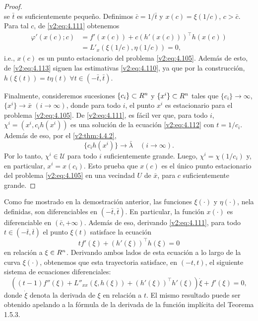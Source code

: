 \begin{proof}
\begin{equation}
        \label{v2:eq:4.113}
    \end{equation}
    se $\bar{t}$ es suficientemente pequeño.
    Definimos $\bar{c} = 1/\bar{t}$ y $x(c) = \xi(1/c)$, $c > \bar{c}$. Para tal $c$, de \eqref{v2:eq:4.111} obtenemos
    \begin{align*}
        \varphi'(x(c); c) &= f'(x(c)) + c(h'(x(c)))^\top h(x(c)) \\
        &= L'_x(\xi(1/c), \eta(1/c)) = 0,
    \end{align*}
    i.e., $x(c)$ es un punto estacionario del problema \eqref{v2:eq:4.105}. Además de esto, de \eqref{v2:eq:4.113} siguen las estimativas \eqref{v2:eq:4.110}, ya que por la construcción, $h(\xi(t)) = t\eta(t) \; \forall t \in (-\bar{t}, \bar{t})$.

    Finalmente, consideremos sucesiones $\{c_i\} \subset R^n$ y $\{x^i\} \subset R^n$ tales que $\{c_i\} \to \infty$, $\{x^i\} \to \bar{x}$ $(i \to \infty)$, donde para todo $i$, el punto $x^i$ es estacionario para el problema \eqref{v2:eq:4.105}. De \eqref{v2:eq:4.111}, es fácil ver que, para todo $i$, $\chi^i = (x^i, c_i h(x^i))$ es una solución de la ecuación \eqref{v2:eq:4.112} con $t = 1/c_i$. Además de eso, por el \cref{v2:thm:4.4.2},
    \[
        \{c_i h(x^i)\} \to \bar{\lambda} \quad (i \to \infty).
    \]
    Por lo tanto, $\chi^i \in \mathcal{U}$ para todo $i$ suficientemente grande. Luego, $\chi^i = \chi(1/c_i)$ y, en particular, $x^i = x(c_i)$. Esto prueba que $x(c)$ es el único punto estacionario del problema \eqref{v2:eq:4.105} en una vecindad $U$ de $\bar{x}$, para $c$ suficientemente grande.
\end{proof}

Como fue mostrado en la demostración anterior, las funciones $\xi(\cdot)$ y $\eta(\cdot)$, nela definidas, son diferenciables en $(-\bar{t}, \bar{t})$. En particular, la función $x(\cdot)$ es diferenciable en $(\bar{c}, +\infty)$. Además de eso, derivando \eqref{v2:eq:4.111}, para todo $t \in (-\bar{t}, \bar{t})$ el punto $\xi(t)$ satisface la ecuación
\begin{equation}
    t f'(\xi) + (h'(\xi))^\top h(\xi) = 0
    \label{v2:eq:4.114}
\end{equation}
en relación a $\xi \in R^n$. Derivando ambos lados de esta ecuación a lo largo de la curva $\xi(\cdot)$, obtenemos que esta trayectoria satisface, en $(-t, t)$, el siguiente sistema de ecuaciones diferenciales:
\begin{equation}
    ((t - 1)f''(\xi) + L''_{xx}(\xi, h(\xi)) + (h'(\xi))^\top h'(\xi))\dot{\xi} + f'(\xi) = 0,
    \label{v2:eq:4.115}
\end{equation}
donde $\dot{\xi}$ denota la derivada de $\xi$ en relación a $t$. El mismo resultado puede ser obtenido apelando a la fórmula de la derivada de la función implícita del Teorema 1.5.3.

